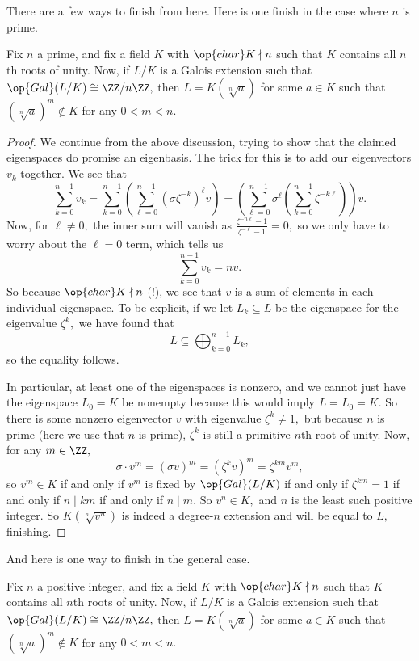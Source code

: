 There are a few ways to finish from here. Here is one finish in the case where $n$ is prime.
\begin{theorem}
	Fix $n$ a prime, and fix a field $K$ with $\op{char}K\nmid n$ such that $K$ contains all $n$th roots of unity. Now, if $L/K$ is a Galois extension such that $\op{Gal}(L/K)\cong\ZZ/n\ZZ,$ then $L=K(\sqrt[n]a)$ for some $a\in K$ such that $(\sqrt[n]a)^m\notin K$ for any $0<m<n.$
\end{theorem}
\begin{proof}
	We continue from the above discussion, trying to show that the claimed eigenspaces do promise an eigenbasis. The trick for this is to add our eigenvectors $v_k$ together. We see that
	\[\sum_{k=0}^{n-1}v_k=\sum_{k=0}^{n-1}\left(\sum_{\ell=0}^{n-1}\left(\sigma\zeta^{-k}\right)^\ell v\right)=\left(\sum_{\ell=0}^{n-1}\sigma^\ell\left(\sum_{k=0}^{n-1}\zeta^{-k\ell}\right)\right)v.\]
	Now, for $\ell\ne0,$ the inner sum will vanish as $\frac{\zeta^{-n\ell}-1}{\zeta^{-\ell}-1}=0,$ so we only have to worry about the $\ell=0$ term, which tells us
	\[\sum_{k=0}^{n-1}v_k=nv.\]
	So because $\op{char}K\nmid n$ (!), we see that $v$ is a sum of elements in each individual eigenspace. To be explicit, if we let $L_k\subseteq L$ be the eigenspace for the eigenvalue $\zeta^k,$ we have found that
	\[L\subseteq\bigoplus_{k=0}^{n-1}L_k,\]
	so the equality follows.
	
	In particular, at least one of the eigenspaces is nonzero, and we cannot just have the eigenspace $L_0=K$ be nonempty because this would imply $L=L_0=K.$ So there is some nonzero eigenvector $v$ with eigenvalue $\zeta^k\ne1,$ but because $n$ is prime (here we use that $n$ is prime), $\zeta^k$ is still a primitive $n$th root of unity. Now, for any $m\in\ZZ,$
	\[\sigma\cdot v^m=(\sigma v)^m=(\zeta^k v)^m=\zeta^{km}v^m,\]
	so $v^m\in K$ if and only if $v^m$ is fixed by $\op{Gal}(L/K)$ if and only if $\zeta^{km}=1$ if and only if $n\mid km$ if and only if $n\mid m.$ So $v^n\in K,$ and $n$ is the least such positive integer. So $K(\sqrt[n]{v^n})$ is indeed a degree-$n$ extension and will be equal to $L,$ finishing.
\end{proof}
And here is one way to finish in the general case.
\begin{theorem} \label{thm:kummerchar0}
	Fix $n$ a positive integer, and fix a field $K$ with $\op{char}K\nmid n$ such that $K$ contains all $n$th roots of unity. Now, if $L/K$ is a Galois extension such that $\op{Gal}(L/K)\cong\ZZ/n\ZZ,$ then $L=K(\sqrt[n]a)$ for some $a\in K$ such that $(\sqrt[n]a)^m\notin K$ for any $0<m<n.$
\end{theorem}
